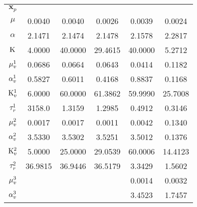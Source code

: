  


{\renewcommand{\arraystretch}{1.5}%
\begin{table}[htbp]
    \centering
    \begin{tabular}{cS[table-format=5.4]S[table-format=5.4]S[table-format=5.4]S[table-format=5.4]S[table-format=5.4]}
        \toprule
           &  {} &  {} &  {} &  {} &  {} \\ \midrule   
        \(\bm{x}_{p}\)    &  {} &  {} &  {} &  {} &  {} \\ \midrule   
        \(\mu\)           &  0.0040       &     0.0040    & 0.0026        &     0.0039    &     0.0024	  \\
        \(\alpha\)        &  2.1471       &     2.1474    & 2.1478        &     2.1578    &     2.2817	  \\ 
        \(\mathrm{K}\)            &  4.0000       &     40.0000   & 29.4615       &     40.0000   &     5.2712	  \\
        \(\mu_{v}^{1}\)      &  0.0686       &     0.0664    & 0.0643        &     0.0414    &     0.1182	  \\
        \(\alpha_{v}^{1}\)       &  0.5827       &     0.6011    & 0.4168        &     0.8837    &     0.1168	  \\
        \(\mathrm{K}_{v}^{1}\)       &  6.0000       &     60.0000   & 61.3862       &     59.9990   &     25.7008   \\
        \(\tau_{r}^{1}\)  &  3158.0       &     1.3159    & 1.2985        &     0.4912    &     0.3146	  \\
        \(\mu_{v}^{2}\)      &  0.0017       &     0.0017    & 0.0011        &     0.0042    &     0.1340	  \\
        \(\alpha_{v}^{2}\)       &  3.5330       &     3.5302    & 3.5251        &     3.5012    &     0.1376	  \\ 
        \(\mathrm{K}_{v}^{2}\)       &  5.0000       &     25.0000   & 29.0539       &     60.0006   &     14.4123   \\ 
        \(\tau_{r}^{2}\)  & 36.9815       &     36.9446   & 36.5179       &     3.3429    &     1.5602	  \\ 
        \(\mu_{v}^{3}\)      &     \text{-}  &     \text{-}  &    \text{-}   &     0.0014    &     0.0032	  \\
        \(\alpha_{v}^{3}\)       &     \text{-}  &     \text{-}  &    \text{-}   &     3.4523    &     1.7457	  \\ 

\end{tabular}
\end{table}}
